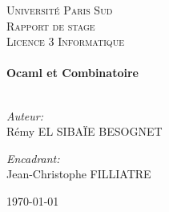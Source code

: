 \begin{titlepage}

\begin{center}



\textsc{\LARGE Université Paris Sud}\\[1.5cm]

\textsc{\Large Rapport de stage}\\[0.5cm]

\textsc{\Large Licence 3 Informatique}\\[0.5cm]

\HRule \\[0.4cm]
{ \huge \bfseries Ocaml et Combinatoire}\\[0.4cm]

\HRule \\[1.5cm]

\begin{minipage}{0.4\textwidth}
\begin{flushleft} \large
\emph{Auteur:}\\
Rémy \textsc{EL SIBAÏE BESOGNET}
\end{flushleft}
\end{minipage}
\begin{minipage}{0.4\textwidth}
\begin{flushright} \large
\emph{Encadrant:} \\
Jean-Christophe \textsc{FILLIATRE}
\end{flushright}
\end{minipage}

\vfill

{\large \today}

\end{center}

\end{titlepage}
